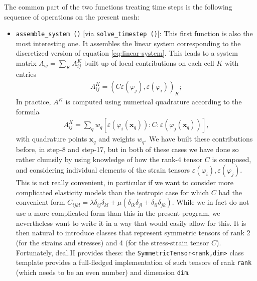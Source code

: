 \documentclass{article}
\renewcommand{\vec}[1]{\mathbf{#1}}
\begin{document}
The common part of the two functions treating time steps is the following
sequence of operations on the present mesh:
\begin{itemize}
\item \texttt{assemble\_system ()} [via \texttt{solve\_timestep ()}]:
  This first function is also the most interesting one. It assembles the
  linear system corresponding to the discretized version of equation
  \eqref{eq:linear-system}. This leads to a system matrix $A_{ij} = \sum_K
  A^K_{ij}$ built up of local contributions on each cell $K$ with entries
  \begin{gather}
    A^K_{ij} = (C \varepsilon(\varphi_j), \varepsilon(\varphi_i))_K;
  \end{gather}
  In practice, $A^K$ is computed using numerical quadrature according to the
  formula
  \begin{gather}
    A^K_{ij} = \sum_q w_q [\varepsilon(\varphi_i(\vec x_q)) : C :
                           \varepsilon(\varphi_j(\vec x_q))],
  \end{gather}
  with quadrature points $\vec x_q$ and weights $w_q$. We have built these
  contributions before, in step-8 and step-17, but in both of these cases we
  have done so rather clumsily by using knowledge of how the rank-4 tensor $C$
  is composed, and considering individual elements of the strain tensors
  $\varepsilon(\varphi_i),\varepsilon(\varphi_j)$. This is not really
  convenient, in particular if we want to consider more complicated elasticity
  models than the isotropic case for which $C$ had the convenient form
  $C_{ijkl}  = \lambda \delta_{ij} \delta_{kl} + \mu (\delta_{ik} \delta_{jl}
  + \delta_{il} \delta_{jk})$. While we in fact do not use a more complicated
  form than this in the present program, we nevertheless want to write it in a
  way that would easily allow for this. It is then natural to introduce
  classes that represent symmetric tensors of rank 2 (for the strains and
  stresses) and 4 (for the stress-strain tensor $C$). Fortunately, deal.II
  provides these: the \texttt{SymmetricTensor<rank,dim>} class template
  provides a full-fledged implementation of such tensors of rank \texttt{rank}
  (which needs to be an even number) and dimension \texttt{dim}.


\end{itemize}
\end{document}
